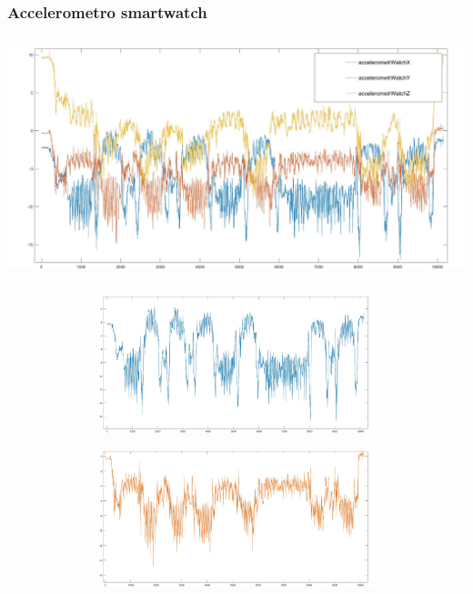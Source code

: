 \documentclass[a4paper]{article}
\begin{document}
\clearpage

\subsubsection{Accelerometro smartwatch}
\begin{minipage}{\linewidth}
\begin{center}
\includegraphics[width=160mm, height= 70mm]{./images/registrazione_tesi/accelerometrXYZ.jpg} 
\end{center}
\end{minipage}
\makebox[\linewidth]{}
\makebox[\linewidth]{}\makebox[\linewidth]{}\makebox[\linewidth]{}
\makebox[\linewidth]{}\makebox[\linewidth]{}\makebox[\linewidth]{}
\makebox[\linewidth]{}\makebox[\linewidth]{}\makebox[\linewidth]{}

\begin{minipage}{\linewidth}
\begin{center}
\includegraphics[width=154mm, height= 40mm]{./images/registrazione_tesi/accX.jpg} 
\end{center}
\end{minipage}
\makebox[\linewidth]{}

\begin{minipage}{\linewidth}
\begin{center}
\includegraphics[width=154mm, height= 40mm]{./images/registrazione_tesi/accY.jpg} 
\end{center}
\end{minipage}
\makebox[\linewidth]{}
\end{document}
